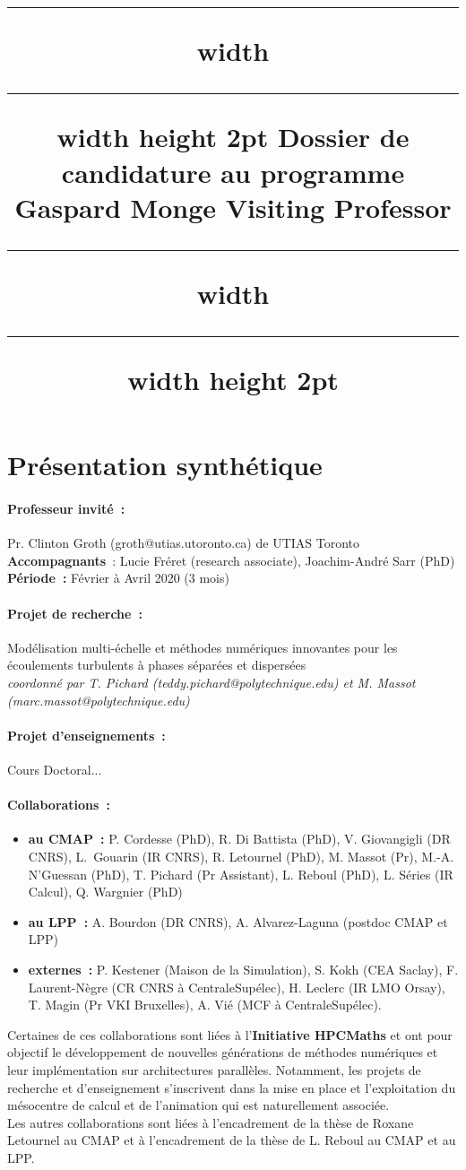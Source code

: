 \documentclass[12pt]{article}
\date{}
\title{\vspace{-1cm}\hrule width \hsize \kern 1mm \hrule width \hsize height 2pt \vspace{5mm}
  Dossier de candidature au programme \og{}Gaspard Monge Visiting Professor\fg{} \\ 
  \vspace{5mm}\hrule width \hsize \kern 1mm \hrule width \hsize height 2pt \vspace{5mm}}
\author{}
\begin{document}
\vspace{-10cm}
\maketitle

\section{Présentation synthétique}

\paragraph{Professeur invité~:} Pr. Clinton Groth (groth@utias.utoronto.ca) de UTIAS Toronto\\
\textbf{Accompagnants}~: Lucie Fréret (research associate), Joachim-André Sarr (PhD) \\
\textbf{Période~:} Février à Avril 2020 (3 mois)

\paragraph{Projet de recherche~:}
Modélisation multi-échelle et méthodes numériques innovantes pour les écoulements turbulents à phases séparées et dispersées\\
{\it coordonné par T. Pichard (teddy.pichard@polytechnique.edu) et M. Massot (marc.massot@polytechnique.edu)}
\paragraph{Projet d'enseignements~:}
Cours Doctoral...

\paragraph{Collaborations~:} \begin{itemize}
\item \textbf{au CMAP~:} P. Cordesse (PhD), R. Di Battista (PhD), V. Giovangigli (DR CNRS), L.~Gouarin (IR CNRS), R. Letournel (PhD), M. Massot (Pr), M.-A. N'Guessan (PhD), T. Pichard (Pr Assistant),  L. Reboul (PhD), L. S\'eries (IR Calcul), Q. Wargnier (PhD)
\item \textbf{au LPP~:} A. Bourdon (DR CNRS), A. Alvarez-Laguna (postdoc CMAP et LPP)
\item \textbf{externes~:} P. Kestener (Maison de la Simulation), S. Kokh (CEA Saclay), F. Laurent-Nègre (CR CNRS à CentraleSupélec), H. Leclerc (IR LMO Orsay), T. Magin (Pr VKI Bruxelles), A. Vié (MCF à CentraleSupélec).
\end{itemize}
Certaines de ces collaborations sont liées à l'\textbf{Initiative HPC\at{}Maths} et ont pour objectif le développement de nouvelles générations de méthodes numériques et leur implémentation sur architectures parallèles. Notamment, les projets de recherche et d'enseignement s'inscrivent dans la mise en place et l'exploitation du mésocentre de calcul et de l'animation qui est naturellement associée. \\
Les autres collaborations sont liées à l'encadrement de la thèse de Roxane Letournel au CMAP et à l'encadrement de la thèse de L. Reboul au CMAP et au LPP.
\end{document}

